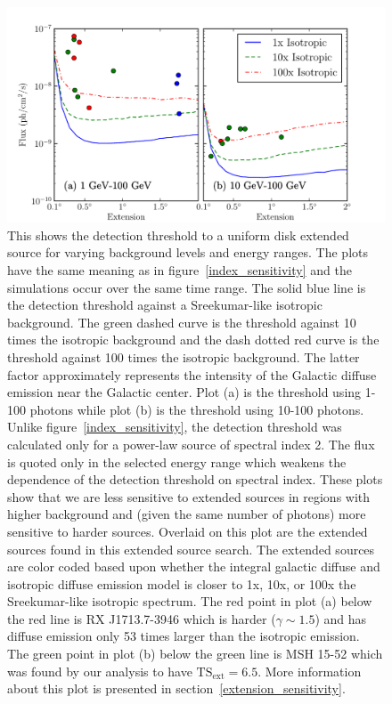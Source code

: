 \documentclass[12pt,preprint]{aastex}
\newcommand{\gev}{\text{GeV}\xspace}
\newcommand{\tsext}{{\ensuremath{\text{TS}_{\text{ext}}}}\xspace}
\renewcommand{\approx}{\sim\!\xspace}
\begin{document}
\clearpage

\begin{figure}
  \begin{center}
    \includegraphics{mc_plots/diff_factor_sensitivity.pdf}
    \end{center}
    \caption{
    This shows the detection threshold to a uniform disk extended
    source for varying background levels
    and energy ranges.  The plots have the same meaning as in
    figure~\ref{index_sensitivity} and the simulations occur over the
    same time range.  The solid blue line is the detection threshold against a
    Sreekumar-like isotropic background. The green dashed curve is the
    threshold against 10 times the isotropic background and the dash
    dotted red curve is the threshold against 100 times the isotropic
    background.  The latter factor approximately represents the intensity
    of the Galactic diffuse emission near the Galactic center.  Plot (a)
    is the threshold using 1-100\gev photons while plot (b) is the threshold using
    10-100\gev photons. Unlike figure~\ref{index_sensitivity},
    the detection threshold was calculated only for a power-law source of spectral
    index 2. The flux is quoted only in the selected energy range which
    weakens the dependence of the detection threshold on spectral index.
    These plots show that we are less sensitive to extended sources in
    regions with higher background and (given the same number of photons)
    more sensitive to harder sources.  Overlaid on this plot are the
    extended sources found in this extended source search. The extended
    sources are color coded based upon whether the integral galactic
    diffuse and isotropic diffuse emission model is closer to 1x, 10x,
    or 100x the Sreekumar-like isotropic spectrum.  The red point
    in plot (a) below the red line is RX J1713.7-3946 which is harder
    ($\gamma\approx1.5$) and has diffuse emission only 53 times larger
    than the isotropic emission.  The green point in plot (b) below
    the green line is MSH 15-52 which was found by our analysis to
    have $\tsext=6.5$.  More information about this plot is presented
    in section~\ref{extension_sensitivity}.
    }\label{diff_factor_sensitivity}
  \end{figure}
\end{document}
